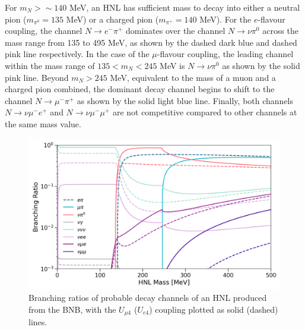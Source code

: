 For $m_{N} > \sim140$ MeV, an HNL has sufficient mass to decay into either a neutral pion ($m_{\pi^{0}}=135$ MeV) or a charged pion ($m_{\pi^{+}}=140$ MeV). 
For the $e$-flavour coupling, the channel $N\rightarrow e^{-}\pi^{+}$ dominates over the channel $N\rightarrow \nu \pi^{0}$ across the mass range from 135 to 495 MeV, as shown by the dashed dark blue and dashed pink line respectively.
In the case of the $\mu$-flavour coupling, the leading channel within the mass range of $135 < m_{N} < 245 $ MeV is $N\rightarrow \nu \pi^{0}$ as shown by the solid pink line.
Beyond $m_{N} > 245$ MeV, equivalent to the mass of a muon and a charged pion combined, the dominant decay channel begins to shift to the channel $N\rightarrow \mu^{-}\pi^{+}$ as shown by the solid light blue line.
Finally, both channels $N\rightarrow \nu \mu^{-}e^{+}$ and $N\rightarrow \nu \mu^{-}\mu^{+}$ are not competitive compared to other channels at the same mass value.  

\begin{figure}[ht!] 
\centering    
\includegraphics[width=1.0\textwidth]{branching_ratio}
\caption[Branching Ratio of Heavy Neutral Leptons]
{
Branching ratios of probable decay channels of an HNL produced from the BNB, with the $U_{\mu4}$ ($U_{e4}$) coupling plotted as solid (dashed) lines.
}
\label{fig:branchingRatio}
\end{figure}


